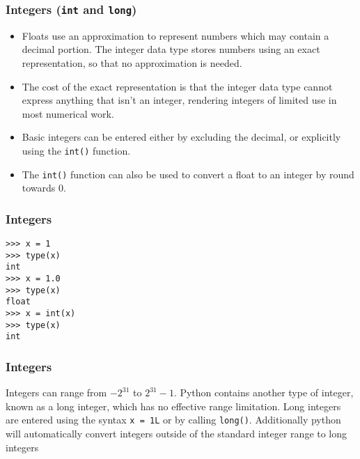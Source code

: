\documentclass[KSmainSlides.tex]{subfiles}
\begin{document}
\begin{frame}[fragile]
\subsubsection{Integers (\texttt{int} and \texttt{long})}
\begin{itemize}
\item Floats use an approximation to represent numbers which may contain a decimal portion. The integer data
type stores numbers using an exact representation, so that no approximation is needed. \item The cost of the
exact representation is that the integer data type cannot express anything that isn’t an integer, rendering
integers of limited use in most numerical work.
\item Basic integers can be entered either by excluding the decimal, or explicitly using the \texttt{int()}
function. 

\item The \texttt{int()} function can also be used to convert a float to an integer by round towards 0.
\end{itemize}

\end{frame}
\begin{frame}[fragile]
\frametitle{Integers}
\begin{framed}
\begin{verbatim}
>>> x = 1
>>> type(x)
int
>>> x = 1.0
>>> type(x)
float
>>> x = int(x)
>>> type(x)
int
\end{verbatim}
\end{framed}

\end{frame}
\begin{frame}[fragile]
\frametitle{Integers}
	\noindent Integers can range from $-2^{31}$ to $2^{31}-1$. 
Python contains another type of integer, known as a long
integer, which has no effective range limitation. Long integers are entered using the syntax \texttt{x = 1L} or by
calling \texttt{long()}. Additionally python will automatically convert integers outside of the standard integer
range to long integers

\end{frame}
\end{document}
